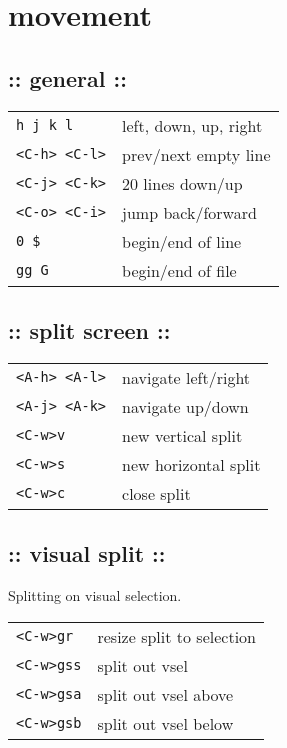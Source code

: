 \section{\hrulefill movement\hrulefill}

\subsection{:: general ::}
\begin{tabular}{@{}ll@{}}
    \verb!h j k l!          & left, down, up, right \\
    \verb!<C-h> <C-l>!      & prev/next empty line \\
    \verb!<C-j> <C-k>!      & 20 lines down/up \\
    \verb!<C-o> <C-i>!      & jump back/forward \\
    \verb!0 $!              & begin/end of line \\
    \verb!gg G!             & begin/end of file \\
\end{tabular}

\subsection{:: split screen ::}
\begin{tabular}{@{}ll@{}}
    \verb!<A-h> <A-l>!      & navigate left/right \\
    \verb!<A-j> <A-k>!      & navigate up/down \\
    \verb!<C-w>v!           & new vertical split \\
    \verb!<C-w>s!           & new horizontal split \\
    \verb!<C-w>c!           & close split \\
\end{tabular}

\subsection{:: visual split ::}
Splitting on visual selection. \\
\begin{tabular}{@{}ll@{}}
    \verb!<C-w>gr!          & resize split to selection \\
    \verb!<C-w>gss!         & split out vsel \\
    \verb!<C-w>gsa!         & split out vsel above \\
    \verb!<C-w>gsb!         & split out vsel below \\
\end{tabular}

